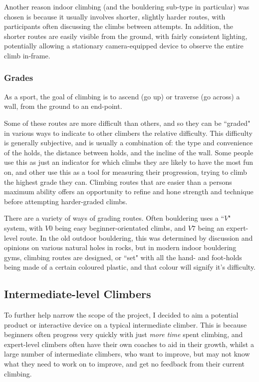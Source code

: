 Another reason indoor climbing (and the bouldering sub-type in particular) was chosen is because it usually involves shorter, slightly harder routes, with participants often discussing the climbs between attempts.
In addition, the shorter routes are easily visible from the ground, with fairly consistent lighting, potentially allowing a stationary camera-equipped device to observe the entire climb in-frame.



\subsubsection{Grades}
As a sport, the goal of climbing is to ascend (go up) or traverse (go across) a wall, from the ground to an end-point.

Some of these routes are more difficult than others, and so they can be ``graded" in various ways to indicate to other climbers the relative difficulty.
This difficulty is generally subjective, and is usually a combination of: the type and convenience of the holds, the distance between holds, and the incline of the wall.
Some people use this as just an indicator for which climbs they are likely to have the most fun on, and other use this as a tool for measuring their progression, trying to climb the highest grade they can.
Climbing routes that are easier than a persons maximum ability offers an opportunity to refine and hone strength and technique before attempting harder-graded climbs.

There are a variety of ways of grading routes.
Often bouldering uses a ``$V$" system, with $V0$ being easy beginner-orientated climbs, and $V7$ being an expert-level route.
In the old outdoor bouldering, this was determined by discussion and opinions on various natural holes in rocks, but in modern indoor bouldering gyms, climbing routes are designed, or ``set" with all the hand- and foot-holds being made of a certain coloured plastic, and that colour will signify it's difficulty.



\subsection{Intermediate-level Climbers}
To further help narrow the scope of the project, I decided to aim a potential product or interactive device on a typical intermediate climber.
This is because beginners often progress very quickly with just \textit{more time} spent climbing, and expert-level climbers often have their own coaches to aid in their growth, whilst a large number of intermediate climbers, who want to improve, but may not know what they need to work on to improve, and get no feedback from their current climbing.

